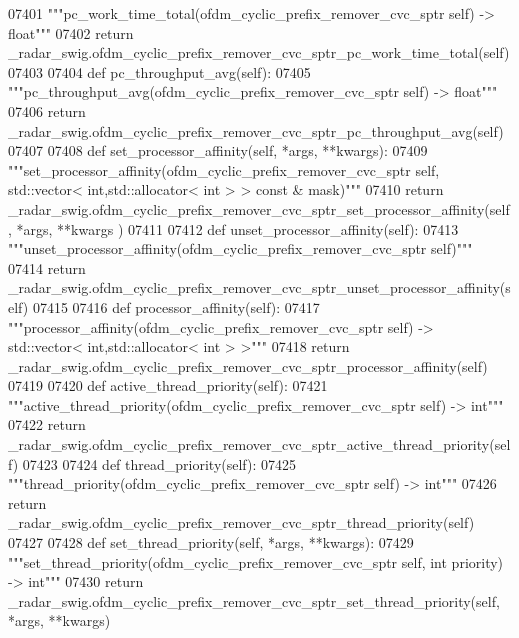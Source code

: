 \begin{DoxyCode}
{{{{{{{{{{{{{{{{{{{{{{{{07401         \textcolor{stringliteral}{"""pc\_work\_time\_total(ofdm\_cyclic\_prefix\_remover\_cvc\_sptr self) -> float"""}
07402         \textcolor{keywordflow}{return} \_radar\_swig.ofdm\_cyclic\_prefix\_remover\_cvc\_sptr\_pc\_work\_time\_total(self)
07403 
07404     \textcolor{keyword}{def }pc_throughput_avg(self):
07405         \textcolor{stringliteral}{"""pc\_throughput\_avg(ofdm\_cyclic\_prefix\_remover\_cvc\_sptr self) -> float"""}
07406         \textcolor{keywordflow}{return} \_radar\_swig.ofdm\_cyclic\_prefix\_remover\_cvc\_sptr\_pc\_throughput\_avg(self)
07407 
07408     \textcolor{keyword}{def }set_processor_affinity(self, *args, **kwargs):
07409         \textcolor{stringliteral}{"""set\_processor\_affinity(ofdm\_cyclic\_prefix\_remover\_cvc\_sptr self, std::vector<
       int,std::allocator< int > > const & mask)"""}
07410         \textcolor{keywordflow}{return} \_radar\_swig.ofdm\_cyclic\_prefix\_remover\_cvc\_sptr\_set\_processor\_affinity(self, *args, **kwargs
      )
07411 
07412     \textcolor{keyword}{def }unset_processor_affinity(self):
07413         \textcolor{stringliteral}{"""unset\_processor\_affinity(ofdm\_cyclic\_prefix\_remover\_cvc\_sptr self)"""}
07414         \textcolor{keywordflow}{return} \_radar\_swig.ofdm\_cyclic\_prefix\_remover\_cvc\_sptr\_unset\_processor\_affinity(self)
07415 
07416     \textcolor{keyword}{def }processor_affinity(self):
07417         \textcolor{stringliteral}{"""processor\_affinity(ofdm\_cyclic\_prefix\_remover\_cvc\_sptr self) -> std::vector< int,std::allocator<
       int > >"""}
07418         \textcolor{keywordflow}{return} \_radar\_swig.ofdm\_cyclic\_prefix\_remover\_cvc\_sptr\_processor\_affinity(self)
07419 
07420     \textcolor{keyword}{def }active_thread_priority(self):
07421         \textcolor{stringliteral}{"""active\_thread\_priority(ofdm\_cyclic\_prefix\_remover\_cvc\_sptr self) -> int"""}
07422         \textcolor{keywordflow}{return} \_radar\_swig.ofdm\_cyclic\_prefix\_remover\_cvc\_sptr\_active\_thread\_priority(self)
07423 
07424     \textcolor{keyword}{def }thread_priority(self):
07425         \textcolor{stringliteral}{"""thread\_priority(ofdm\_cyclic\_prefix\_remover\_cvc\_sptr self) -> int"""}
07426         \textcolor{keywordflow}{return} \_radar\_swig.ofdm\_cyclic\_prefix\_remover\_cvc\_sptr\_thread\_priority(self)
07427 
07428     \textcolor{keyword}{def }set_thread_priority(self, *args, **kwargs):
07429         \textcolor{stringliteral}{"""set\_thread\_priority(ofdm\_cyclic\_prefix\_remover\_cvc\_sptr self, int priority) -> int"""}
07430         \textcolor{keywordflow}{return} \_radar\_swig.ofdm\_cyclic\_prefix\_remover\_cvc\_sptr\_set\_thread\_priority(self, *args, **kwargs)
}}}}}}}}}}}}}}}}}}}}}}}}
\end{DoxyCode}

